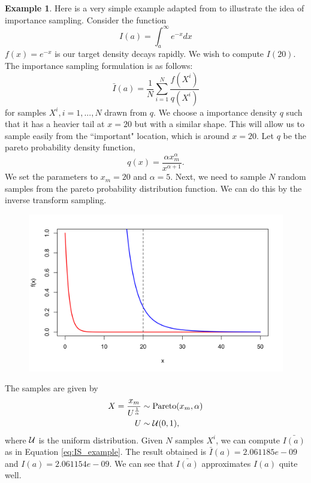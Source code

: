 \documentclass[10pt]{article}
\theoremstyle{definition}
\numberwithin{equation}{section}
\begin{document}
\theoremstyle{definition}
\newtheorem{exmp}{Example}
\begin{exmp}
Here is a very simple example adapted from \cite{impint} to illustrate the idea of importance sampling. Consider the function
	\begin{equation}
		I(a) = \int_a^\infty e^{-x} dx
	\end{equation}
$f(x) = e^{-x}$ is our target density decays rapidly. We wish to compute $I(20)$. The importance sampling formulation is as follows:
\begin{equation} \label{eq:IS_example}
	\bar{I}(a) = \frac{1}{N} \sum_{i=1}^{N} \dfrac{f(X^i)}{q(X^i)}
\end{equation} for samples $X^i, i=1,...,N$ drawn from $q$. We choose a importance density $q$ such that it has a heavier tail at $x=20$ but with a similar shape. This will allow us to sample easily from the ``important" location, which is around $x=20$. Let $q$ be the pareto probability density function,
	\begin{equation}
		q(x) = \dfrac{\alpha x^\alpha_m}{x^{\alpha + 1}}.
	\end{equation}
We set the parameters to $x_m = 20$ and $\alpha = 5$. Next, we need to sample $N$ random samples from the pareto probability distribution function. We can do this by the inverse transform sampling. 
\begin{figure}[htp]
	\centering
	\includegraphics[scale=0.22]{target}
\end{figure}
The samples are given by 
\begin{align}
	X = \dfrac{x_m}{U^{\frac{1}{\alpha}}} &\sim \text{Pareto}(x_m,\alpha)\\	U &\sim \mathcal{U}(0,1), \nonumber
\end{align} where $\mathcal{U}$ is the uniform distribution.
Given $N$ samples $X^{i}$, we can compute $\bar{I(a)}$ as in Equation \eqref{eq:IS_example}. The result obtained is $\bar{I}(a) = 2.061185e-09$ and $I(a) =2.061154e-09$. We can see that $\bar{I(a)}$ approximates $I(a)$ quite well.
\end{exmp}
\end{document}

